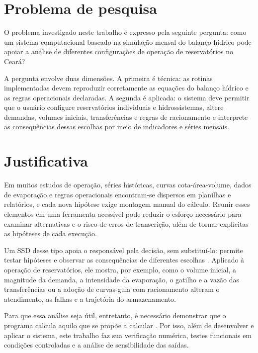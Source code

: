 \section{Problema de pesquisa}
\label{sec:problema}

O problema investigado neste trabalho é expresso pela seguinte pergunta: como um sistema computacional baseado na simulação mensal do balanço hídrico pode apoiar a análise de diferentes configurações de operação de reservatórios no Ceará?

A pergunta envolve duas dimensões. A primeira é técnica: as rotinas implementadas devem reproduzir corretamente as equações do balanço hídrico e as regras operacionais declaradas. A segunda é aplicada: o sistema deve permitir que o usuário configure reservatórios individuais e hidrossistemas, altere demandas, volumes iniciais, transferências e regras de racionamento e interprete as consequências dessas escolhas por meio de indicadores e séries mensais.

\section{Justificativa}
\label{sec:justificativa}

Em muitos estudos de operação, séries históricas, curvas cota-área-volume, dados de evaporação e regras operacionais encontram-se dispersos em planilhas e relatórios, e cada nova hipótese exige montagem manual do cálculo. Reunir esses elementos em uma ferramenta acessível pode reduzir o esforço necessário para examinar alternativas e o risco de erros de transcrição, além de tornar explícitas as hipóteses de cada execução.

Um \gls{SSD} desse tipo apoia o responsável pela decisão, sem substituí-lo: permite testar hipóteses e observar as consequências de diferentes escolhas \cite{sprague1980}. Aplicado à operação de reservatórios, ele mostra, por exemplo, como o volume inicial, a magnitude da demanda, a intensidade da evaporação, o gatilho e a vazão das transferências ou a adoção de curvas-guia com racionamento alteram o atendimento, as falhas e a trajetória do armazenamento.

Para que essa análise seja útil, entretanto, é necessário demonstrar que o programa calcula aquilo que se propõe a calcular \cite{oberkampfRoy2010,sargent2013}. Por isso, além de desenvolver e aplicar o sistema, este trabalho faz sua verificação numérica, testes funcionais em condições controladas e a análise de sensibilidade das saídas.

